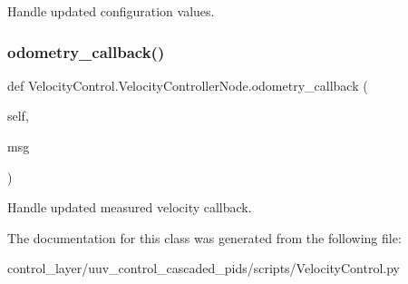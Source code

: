 \begin{DoxyVerb}Handle updated configuration values.\end{DoxyVerb}
 \mbox{\label{classVelocityControl_1_1VelocityControllerNode_afbacd39bef58879044d31ad2934bd2dc}} 
\subsubsection{\texorpdfstring{odometry\+\_\+callback()}{odometry\_callback()}}
{\footnotesize\ttfamily def Velocity\+Control.\+Velocity\+Controller\+Node.\+odometry\+\_\+callback (\begin{DoxyParamCaption}\item[{}]{self,  }\item[{}]{msg }\end{DoxyParamCaption})}

\begin{DoxyVerb}Handle updated measured velocity callback.\end{DoxyVerb}
 

The documentation for this class was generated from the following file\+:\begin{DoxyCompactItemize}
\item 
control\+\_\+layer/uuv\+\_\+control\+\_\+cascaded\+\_\+pids/scripts/Velocity\+Control.\+py\end{DoxyCompactItemize}
